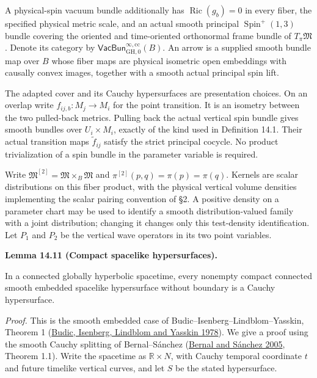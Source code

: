 \documentclass[
  english,
  11pt,
  reqno]{amsart}
\makeatletter
\newcounter{none} %
\newcommand{\pandocstatementheading}[1]{%
  \par\if@nobreak\else
    \addpenalty{\@beginparpenalty}%
    \addvspace{.5\baselineskip plus .2\baselineskip minus .2\baselineskip}%
  \fi
  {\normalfont\bfseries #1\par}%
  \nobreak\@afterindenttrue\@afterheading
}
\makeatother
\begin{document}
A physical-spin vacuum bundle additionally has
\(\operatorname{Ric}(g_b)=0\) in every fiber, the specified physical
metric scale, and an actual smooth principal
\(\operatorname{Spin}^+(1,3)\) bundle covering the oriented and
time-oriented orthonormal frame bundle of \(T_\pi\mathfrak M\). Denote
its category by
\(\mathsf{VacBun}^{\infty,\mathrm{cc}}_{\mathrm{GH},0}(B)\). An arrow is
a supplied smooth bundle map over \(B\) whose fiber maps are physical
isometric open embeddings with causally convex images, together with a
smooth actual principal spin lift.

The adapted cover and its Cauchy hypersurfaces are presentation choices.
On an overlap write \(f_{ij,b}:M_j\to M_i\) for the point transition. It
is an isometry between the two pulled-back metrics. Pulling back the
actual vertical spin bundle gives smooth bundles over \(U_i\times M_i\),
exactly of the kind used in Definition 14.1. Their actual transition
maps \(\widetilde f_{ij}\) satisfy the strict principal cocycle. No
product trivialization of a spin bundle in the parameter variable is
required.

Write \(\mathfrak M^{[2]}=\mathfrak M\times_B\mathfrak M\) and
\(\pi^{[2]}(p,q)=\pi(p)=\pi(q)\). Kernels are scalar distributions on
this fiber product, with the physical vertical volume densities
implementing the scalar pairing convention of §2. A positive density on
a parameter chart may be used to identify a smooth distribution-valued
family with a joint distribution; changing it changes only this
test-density identification. Let \(P_1\) and \(P_2\) be the vertical
wave operators in its two point variables.

\pandocstatementheading{\protect{}\label{lem:compact-spacelike-is-cauchy}Lemma 14.11 (Compact spacelike hypersurfaces).}

In a connected globally hyperbolic spacetime, every nonempty compact
connected smooth embedded spacelike hypersurface without boundary is a
Cauchy hypersurface.

\emph{Proof.} This is the smooth embedded case of
Budic--Isenberg--Lindblom--Yasskin, Theorem 1
(\hyperref[ref-BudicIsenbergLindblomYasskin1978]{Budic, Isenberg,
Lindblom and Yasskin 1978}). We give a proof using the smooth Cauchy
splitting of Bernal--Sánchez (\hyperref[ref-BernalSanchez2005]{Bernal
and Sánchez 2005}, Theorem 1.1). Write the spacetime as
\(\mathbb R\times N\), with Cauchy temporal coordinate \(t\) and future
timelike vertical curves, and let \(S\) be the stated hypersurface.
\end{document}
